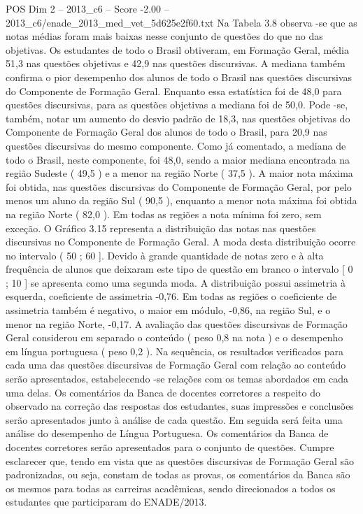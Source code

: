 \begin{textsample}{POS Dim 2 – 2013\_c6 – Score -2.00 – 2013\_c6/enade\_2013\_med\_vet\_5d625e2f60.txt}
Na Tabela 3.8 observa -se que as notas médias foram mais baixas nesse conjunto de questões do que no das objetivas.
Os estudantes de todo o Brasil obtiveram, em Formação Geral, média 51,3 nas questões objetivas e 42,9 nas questões discursivas.
A mediana também confirma o pior desempenho dos alunos de todo o Brasil nas questões discursivas do Componente de Formação Geral.
Enquanto essa estatística foi de 48,0 para questões discursivas, para as questões objetivas a mediana foi de 50,0.
Pode -se, também, notar um aumento do desvio padrão de 18,3, nas questões objetivas do Componente de Formação Geral dos alunos de todo o Brasil, para 20,9 nas questões discursivas do mesmo componente.
Como já comentado, a mediana de todo o Brasil, neste componente, foi 48,0, sendo a maior mediana encontrada na região Sudeste ( 49,5 ) e a menor na região Norte ( 37,5 ).
A maior nota máxima foi obtida, nas questões discursivas do Componente de Formação Geral, por pelo menos um aluno da região Sul ( 90,5 ), enquanto a menor nota máxima foi obtida na região Norte ( 82,0 ).
Em todas as regiões a nota mínima foi zero, sem exceção.
O Gráfico 3.15 representa a distribuição das notas nas questões discursivas no Componente de Formação Geral.
A moda desta distribuição ocorre no intervalo ( 50 ; 60 ].
Devido à grande quantidade de notas zero e à alta frequência de alunos que deixaram este tipo de questão em branco o intervalo [ 0 ; 10 ] se apresenta como uma segunda moda.
A distribuição possui assimetria à esquerda, coeficiente de assimetria -0,76.
Em todas as regiões o coeficiente de assimetria também é negativo, o maior em módulo, -0,86, na região Sul, e o menor na região Norte, -0,17.
A avaliação das questões discursivas de Formação Geral considerou em separado o conteúdo ( peso 0,8 na nota ) e o desempenho em língua portuguesa ( peso 0,2 ).
Na sequência, os resultados verificados para cada uma das questões discursivas de Formação Geral com relação ao conteúdo serão apresentados, estabelecendo -se relações com os temas abordados em cada uma delas.
Os comentários da Banca de docentes corretores a respeito do observado na correção das respostas dos estudantes, suas impressões e conclusões serão apresentados junto à análise de cada questão.
Em seguida será feita uma análise do desempenho de Língua Portuguesa.
Os comentários da Banca de docentes corretores serão apresentados para o conjunto de questões.
Cumpre esclarecer que, tendo em vista que as questões discursivas de Formação Geral são padronizadas, ou seja, constam de todas as provas, os comentários da Banca são os mesmos para todas as carreiras acadêmicas, sendo direcionados a todos os estudantes que participaram do ENADE/2013.

\end{textsample}
